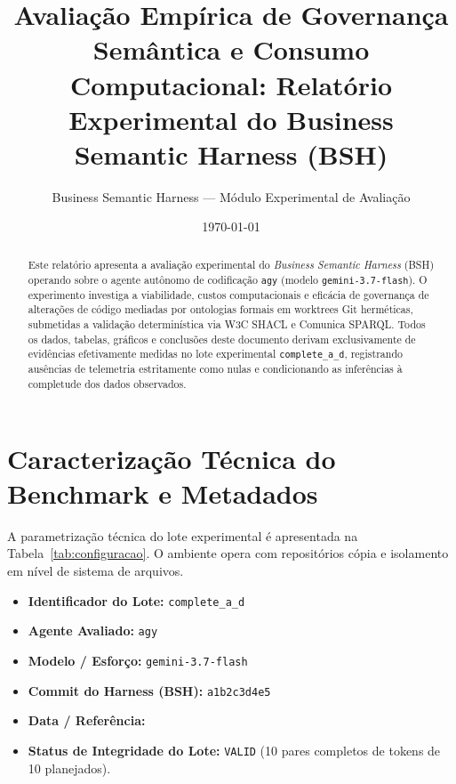 \documentclass[10pt,a4paper]{article}
\title{\textbf{Avaliação Empírica de Governança Semântica e Consumo Computacional: Relatório Experimental do Business Semantic Harness (BSH)}}
\author{Business Semantic Harness --- Módulo Experimental de Avaliação}
\date{\today}
\begin{document}
\maketitle

\begin{abstract}
Este relatório apresenta a avaliação experimental do \emph{Business Semantic Harness} (BSH) operando sobre o agente autônomo de codificação \texttt{agy} (modelo \texttt{gemini-3.7-flash}). O experimento investiga a viabilidade, custos computacionais e eficácia de governança de alterações de código mediadas por ontologias formais em worktrees Git herméticas, submetidas a validação determinística via W3C SHACL e Comunica SPARQL. Todos os dados, tabelas, gráficos e conclusões deste documento derivam exclusivamente de evidências efetivamente medidas no lote experimental \texttt{complete\_a\_d}, registrando ausências de telemetria estritamente como nulas e condicionando as inferências à completude dos dados observados.
\end{abstract}

\section{Caracterização Técnica do Benchmark e Metadados}
A parametrização técnica do lote experimental é apresentada na Tabela~\ref{tab:configuracao}. O ambiente opera com repositórios cópia e isolamento em nível de sistema de arquivos.

\begin{itemize}
  \item \textbf{Identificador do Lote:} \texttt{complete\_a\_d}
  \item \textbf{Agente Avaliado:} \texttt{agy}
  \item \textbf{Modelo / Esforço:} \texttt{gemini-3.7-flash}
  \item \textbf{Commit do Harness (BSH):} \texttt{a1b2c3d4e5}
  \item \textbf{Data / Referência:} \texttt{\textendash}
  \item \textbf{Status de Integridade do Lote:} \texttt{VALID} (10 pares completos de tokens de 10 planejados).
\end{itemize}
\end{document}
